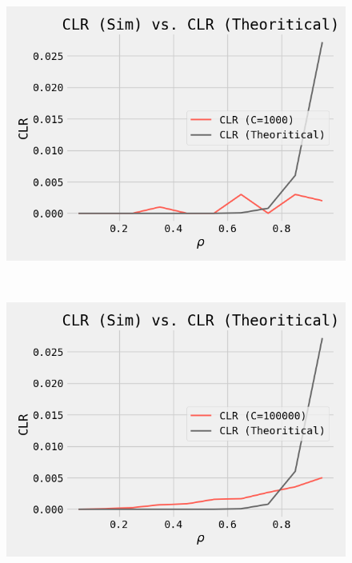 \begin{figure}[ht!]
 \centering
 \begin{minipage}[]{0.33\linewidth}
  \centering
 \includegraphics[width=\linewidth]{Figures/task3_1.png}
 \label{fig1} 
 \end{minipage}~\begin{minipage}[]{0.33\linewidth}
  \centering
  \includegraphics[width=\linewidth]{Figures/task3_2.png}
  \label{fig2}
 \end{minipage}~\begin{minipage}[]{0.33\linewidth}
  \centering

\end{minipage}
\end{figure}
